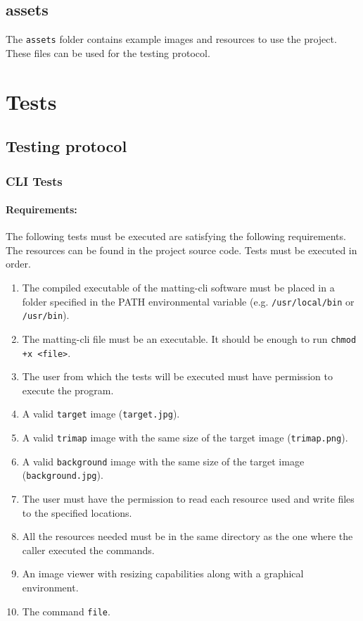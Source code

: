 \documentclass[a4paper]{article}
\begin{document}
\subsection{assets}

The \texttt{assets} folder contains
example images and resources to use the project.
These files can be used for the testing protocol.

\pagebreak

\section{Tests}

\subsection{Testing protocol}

\subsubsection{CLI Tests}

\paragraph{Requirements:}
The following tests must be executed are satisfying the
following requirements. The resources can be found in the project source code.
Tests must be executed in order.

\begin{enumerate}
    \item The compiled executable of the matting-cli software
    must be placed in a folder specified in the \textsc{PATH}
    environmental variable (e.g. \texttt{/usr/local/bin} or \texttt{/usr/bin}).
    \item The matting-cli file must be an executable. It should be enough to run
    \lstinline{chmod +x <file>}.
    \item The user from which the tests will be executed must have permission to execute
    the program.
    \item A valid \texttt{target} image (\texttt{target.jpg}).
    \item A valid \texttt{trimap} image with the same size of the target image (\texttt{trimap.png}).
    \item A valid \texttt{background} image with the same size of the target image (\texttt{background.jpg}).
    \item The user must have the permission to read each resource used and write files
    to the specified locations.
    \item All the resources needed must be in the same directory as the one where the caller executed the commands.
    \item An image viewer with resizing capabilities along with a graphical environment.
    \item The command \texttt{file}.
\end{enumerate}
\end{document}
